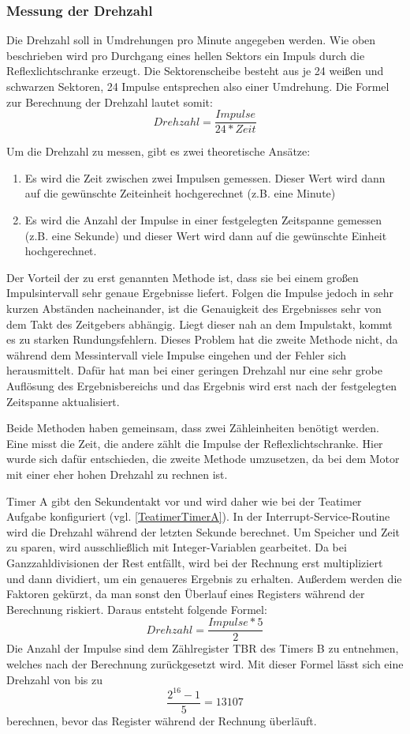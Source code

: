 \documentclass[12pt,a4paper,bibliography=totocnumbered,listof=totocnumbered]{scrartcl}
\begin{document}
\subsubsection{Messung der Drehzahl}
Die Drehzahl soll in Umdrehungen pro Minute angegeben werden. Wie oben beschrieben wird pro Durchgang eines hellen Sektors ein Impuls durch die Reflexlichtschranke erzeugt. Die Sektorenscheibe besteht aus je 24 weißen und schwarzen Sektoren, 24 Impulse entsprechen also einer Umdrehung. Die Formel zur Berechnung der Drehzahl lautet somit: 
\[ Drehzahl = \frac{Impulse}{24*Zeit}  \]

Um die Drehzahl zu messen, gibt es zwei theoretische Ansätze:
\begin{enumerate}
	\item Es wird die Zeit zwischen zwei Impulsen gemessen. Dieser Wert wird dann auf die gewünschte Zeiteinheit hochgerechnet (z.B. eine Minute)
	\item Es wird die Anzahl der Impulse in einer festgelegten Zeitspanne gemessen (z.B. eine Sekunde) und dieser Wert wird dann auf die gewünschte Einheit hochgerechnet.
\end{enumerate}

Der Vorteil der zu erst genannten Methode ist, dass sie bei einem großen Impulsintervall sehr genaue Ergebnisse liefert. Folgen die Impulse jedoch in sehr kurzen Abständen nacheinander, ist die Genauigkeit des Ergebnisses sehr von dem Takt des Zeitgebers abhängig. Liegt dieser nah an dem Impulstakt, kommt es zu starken Rundungsfehlern. Dieses Problem hat die zweite Methode nicht, da während dem Messintervall viele Impulse eingehen und der Fehler sich herausmittelt. Dafür hat man bei einer geringen Drehzahl nur eine sehr grobe Auflösung des Ergebnisbereichs und das Ergebnis wird erst nach der festgelegten Zeitspanne aktualisiert. 

Beide Methoden haben gemeinsam, dass zwei Zähleinheiten benötigt werden. Eine misst die Zeit, die andere zählt die Impulse der Reflexlichtschranke. Hier wurde sich dafür entschieden, die zweite Methode umzusetzen, da bei dem Motor mit einer eher hohen Drehzahl zu rechnen ist.

Timer A gibt den Sekundentakt vor und wird daher wie bei der Teatimer Aufgabe konfiguriert (vgl. \ref{TeatimerTimerA}). In der Interrupt-Service-Routine wird die Drehzahl während der letzten Sekunde berechnet. Um Speicher und Zeit zu sparen, wird ausschließlich mit Integer-Variablen gearbeitet. Da bei Ganzzahldivisionen der Rest entfällt, wird bei der Rechnung erst multipliziert und dann dividiert, um ein genaueres Ergebnis zu erhalten. Außerdem werden die Faktoren gekürzt, da man sonst den Überlauf eines Registers während der Berechnung riskiert. Daraus entsteht folgende Formel: \[ Drehzahl = \frac{Impulse*5}{2}  \] Die Anzahl der Impulse sind dem Zählregister TBR des Timers B zu entnehmen, welches nach der Berechnung zurückgesetzt wird. Mit dieser Formel lässt sich eine Drehzahl von bis zu \[ \frac{2^{16}-1}{5}=13107 \] berechnen, bevor das Register während der Rechnung überläuft. 
\end{document}
